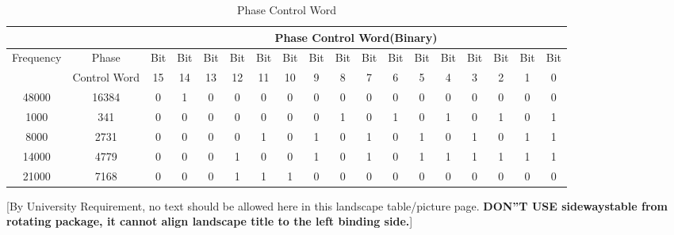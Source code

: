 \begin{landscape}
\begin{table}[!hbtp]
  \centering
  \caption{Phase Control Word}
  \label{tab:exFreqControl}%
    \begin{tabular}{|c|c|c|c|c|c|c|c|c|c|c|c|c|c|c|c|c|c|}
    \toprule
          &       & \multicolumn{16}{|c|}{Phase Control Word(Binary)}                                                                            \\
    \midrule
    Frequency & Phase  & Bit  & Bit  & Bit & Bit  & Bit  & Bit & Bit & Bit  & Bit & Bit & Bit  & Bit  & Bit  & Bit  & Bit  & Bit  \\
    & Control Word & 15 &   14 &   13 &   12 &   11 &   10 &   9 &   8 &   7 &   6 &   5 &   4 &   3 &   2 &   1 &   0 \\
\hline
    48000 & 16384 & 0     & 1     & 0     & 0     & 0     & 0     & 0     & 0     & 0     & 0     & 0     & 0     & 0     & 0     & 0     & 0 \\
    1000  & 341   & 0     & 0     & 0     & 0     & 0     & 0     & 0     & 1     & 0     & 1     & 0     & 1     & 0     & 1     & 0     & 1 \\
    8000  & 2731  & 0     & 0     & 0     & 0     & 1     & 0     & 1     & 0     & 1     & 0     & 1     & 0     & 1     & 0     & 1     & 1 \\
    14000 & 4779  & 0     & 0     & 0     & 1     & 0     & 0     & 1     & 0     & 1     & 0     & 1     & 1     & 1     & 1     & 1     & 1 \\
    21000 & 7168  & 0     & 0     & 0     & 1     & 1     & 1     & 0     & 0     & 0     & 0     & 0     & 0     & 0     & 0     & 0     & 0 \\
    \bottomrule
    \end{tabular}%
    
        [{\small By University Requirement, no text should be allowed here in this landscape table/picture page. \textbf{ DON''T USE sidewaystable from rotating package, it cannot align landscape title to the left binding side.}}]
\end{table}
\end{landscape}
